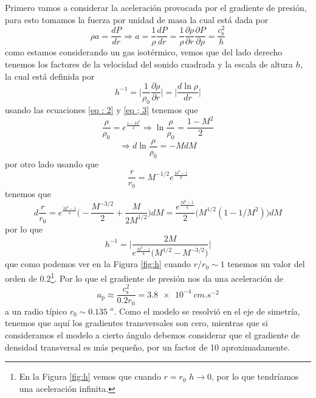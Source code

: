 \documentclass{book}
\begin{document}
Primero vamos a considerar la aceleración provocada por el gradiente de presión, para esto tomamos la fuerza por unidad de masa la cual está dada por 
\begin{equation}
\rho a = \frac{dP}{dr}\Rightarrow a= \frac{1}{\rho}\frac{dP}{dr}=\frac{1}{\rho}\frac{\partial \rho}{\partial r}\frac{\partial P}{\partial\rho}=\frac{c_\mathrm{s}^2}{h}
\end{equation}
como estamos considerando un gas isotérmico, vemos que del lado derecho tenemos los factores de la velocidad del sonido cuadrada y la escala de altura $h$, la cual está definida por 
\begin{equation}
h^{-1}=\Big|\frac{1}{\rho_0}\frac{\partial\rho}{\partial r}\Big|=\Big|\frac{d \ln \rho}{dr}\Big|
\end{equation}
usando las ecuaciones \ref{eq : 2} y \ref{eq ; 3} tenemos que 
\begin{equation}
\frac{\rho}{\rho_0}=e^{\frac{1-M^2}{2}}\Rightarrow\ln\frac{\rho}{\rho_0}=\frac{1-M^2}{2}
\end{equation}
\begin{equation}
\Rightarrow d\ln\frac{\rho}{\rho_0}=-M dM
\end{equation}
por otro lado usando que 
\begin{equation}
\frac{r}{r_0}=M^{-1/2}e^{\frac{M^2-1}{2}}
\end{equation}
tenemos que 
\begin{equation}
d\frac{r}{r_0}=e^{\frac{M^2-1}{4}}\Big(-\frac{M^{-3/2}}{2}+\frac{M}{2M^{1/2}}\Big)dM = \frac{e^{\frac{M^2-1}{4}}}{2}\Big(M^{1/2}(1-1/M^2) \Big)dM
\end{equation}
por lo que 
\begin{equation}
h^{-1}=\Big|\frac{2M}{e^{\frac{M^2-1}{4}}\Big(M^{1/2}-M^{-3/2}\Big)}\Big|
\end{equation}
que como podemos ver en la Figura \ref{fig:h} cuando $r/r_0\sim 1$ tenemos un valor del orden de 0.2\footnote{En la Figura \ref{fig:h} vemos que cuando $r=r_0$ $h\to 0$, por lo que tendríamos una aceleración infinita.}. Por lo que el gradiente de presión nos da una aceleración de 
\begin{equation}
a_\mathrm{p} \approx \frac{c_\mathrm{s}^2}{0.2 r_0} = \SI{3.8e-4}{cm.s^{-2}}
\end{equation}
a un radio típico $r_0\sim \SI{0.135}{\arcsecond}$. Como el modelo se resolvió en el eje de simetría, tenemos que aquí los gradientes transversales son cero, mientras que si consideramos el modelo a cierto ángulo debemos considerar que el gradiente de densidad transversal es más pequeño, por un factor de 10 aproximadamente. 
\end{document}
